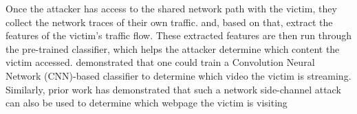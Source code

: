 Once the attacker has access to the shared network path with the victim, they collect the network traces of their own traffic. and, based on that, extract the features of the victim's traffic flow.
These extracted features are then run through the pre-trained classifier, which helps the attacker determine which content the victim accessed. 
\citet{schuster2017beautyburst} demonstrated that one could train a Convolution Neural Network (CNN)-based classifier to determine which video the victim is streaming.
Similarly, prior work has demonstrated that such a network side-channel attack can also be used to determine which webpage the victim is visiting \cite{hayes2016kfp, panchenko2016website, gong2010fingerprinting}

